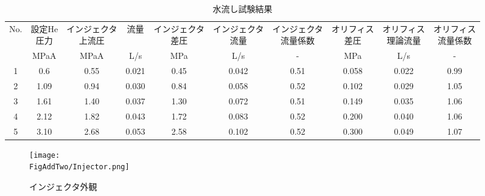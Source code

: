 \begin{table}[htb]
\begin{center}
\caption{水流し試験結果}
\scriptsize
\begin{tabular}{|c|c|c|c|c|c|c|c|c|c|} \hline
No. & \shortstack{設定He\\圧力} & \shortstack{インジェクタ\\上流圧} & 流量 & \shortstack{インジェクタ\\差圧} & \shortstack{インジェクタ\\流量} & \shortstack{インジェクタ\\流量係数} & \shortstack{オリフィス\\差圧} & \shortstack{オリフィス\\理論流量} & \shortstack{オリフィス\\流量係数} \\ \cline{2-10}
 & MPaA & MPaA & L/s & MPa & L/s & - & MPa & L/s & - \\ \hline
1 & 0.6 & 0.55 & 0.021 & 0.45 & 0.042 & 0.51 & 0.058 & 0.022 & 0.99 \\ \hline
2 & 1.09 & 0.94 & 0.030 & 0.84 & 0.058 & 0.52 & 0.102 & 0.029 & 1.05 \\ \hline
3 & 1.61 & 1.40 & 0.037 & 1.30 & 0.072 & 0.51 & 0.149 & 0.035 & 1.06 \\ \hline
4 & 2.12 & 1.82 & 0.043 & 1.72 & 0.083 & 0.52 & 0.200 & 0.040 & 1.06 \\ \hline
5 & 3.10 & 2.68 & 0.053 & 2.58 & 0.102 & 0.52 & 0.300 & 0.049 & 1.07 \\ \hline
\end{tabular}
\label{tab:Water}
\end{center}
\end{table}

\begin{figure}[htb]
\centering
\texttt{[image: \\FigAddTwo/Injector.png]}
\caption{インジェクタ外観}
\label{fig:Injector}
\end{figure}
